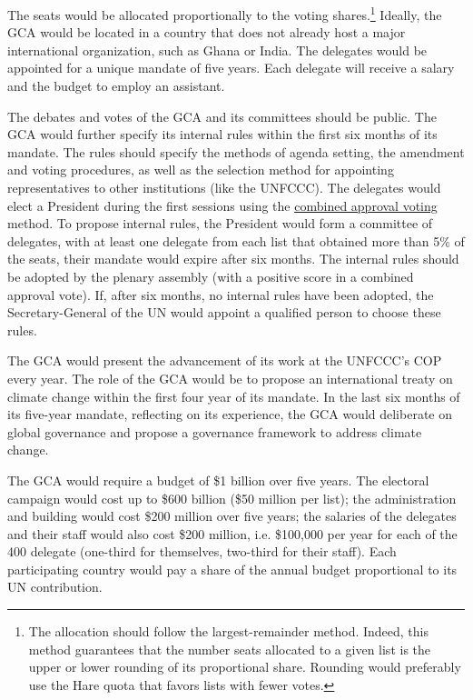 \documentclass[12pt,english]{article}
\begin{document}
The seats would be allocated proportionally to the voting shares.\footnote{The allocation should follow the largest-remainder method. Indeed, this method guarantees that the number seats allocated to a given list is the upper or lower rounding of its proportional share. Rounding would preferably use the Hare quota that favors lists with fewer votes.} Ideally, the GCA would be located in a country that does not already host a major international organization, such as Ghana or India. The delegates would be appointed for a unique mandate of five years. Each delegate will receive a salary and the budget to employ an assistant. %

The debates and votes of the GCA and its committees should be public. The GCA would further specify its internal rules within the first six months of its mandate. The rules should specify the methods of agenda setting, the amendment and voting procedures, as well as the selection method for appointing representatives to other institutions (like the UNFCCC). The delegates would elect a President during the first sessions using the \href{https://en.wikipedia.org/wiki/Combined_approval_voting}{combined approval voting} method. To propose internal rules, the President would form a committee of delegates, with at least one delegate from each list that obtained more than 5\% of the seats, their mandate would expire after six months. The internal rules should be adopted by the plenary assembly (with a positive score in a combined approval vote). If, after six months, no internal rules have been adopted, the Secretary-General of the UN would appoint a qualified person to choose these rules. 

The GCA would present the advancement of its work at the UNFCCC's COP every year. The role of the GCA would be to propose an international treaty on climate change within the first four year of its mandate. In the last six months of its five-year mandate, reflecting on its experience, the GCA would deliberate on global governance and propose a governance framework to address climate change.

The GCA would require a budget of \$1 billion over five years. The electoral campaign would cost up to \$600 billion (\$50 million per list); the administration and building would cost \$200 million over five years; the salaries of the delegates and their staff would also cost \$200 million, i.e. \$100,000 per year for each of the 400 delegate (one-third for themselves, two-third for their staff). Each participating country would pay a share of the annual budget proportional to its UN contribution. 
\end{document}
